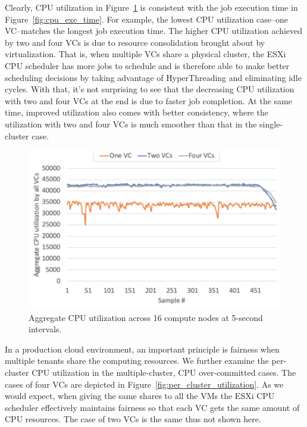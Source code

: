 Clearly, CPU utilization in Figure~\ref{fig:cpu_utilizations} is consistent with the job execution time in Figure~\ref{fig:cpu_exe_time}. For example, the lowest CPU utilization case--one VC--matches the longest job execution time. 
The higher CPU utilization achieved by two and four VCs is due to resource consolidation brought about by virtualization. That is, when multiple VCs share a physical cluster, the ESXi CPU scheduler has more jobs to schedule and is therefore able to make better scheduling decisions by taking advantage of HyperThreading and eliminating idle cycles. 
With that, it's not surprising to see that the decreasing CPU utilization with two and four VCs at the end is due to faster job completion. 
At the same time, improved utilization also comes with better consistency, where the utilization with two and four VCs is much smoother than that in the single-cluster case.

\begin{figure}[!t]
   \begin{center}
       \includegraphics[width=0.8\columnwidth]{Figures/cpu_utilizations.pdf}
   \end{center}
   \caption{Aggregate CPU utilization across 16 compute nodes at 5-second intervals.}
   \label{fig:cpu_utilizations}
 \end{figure}

 In a production cloud environment, an important principle is fairness when multiple tenants share the computing resources. We further examine the per-cluster CPU utilization in the multiple-cluster, CPU over-committed cases.  The cases of four VCs are depicted in Figure~\ref{fig:per_cluster_utilization}. As we would expect, when giving the same shares to all the VMs the ESXi CPU scheduler effectively maintains fairness so that each VC gets the same amount of CPU resources. The case of two VCs is the same thus not shown here. 

